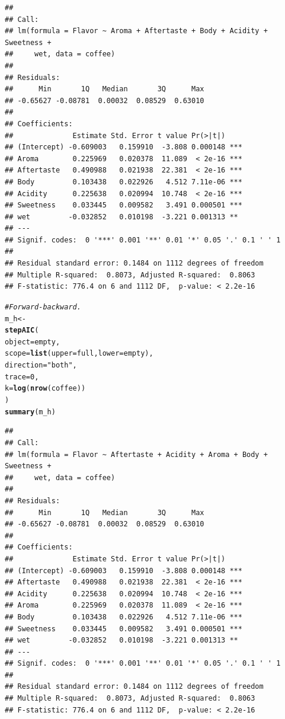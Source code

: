 \documentclass[oneside]{book}\usepackage[]{graphicx}\usepackage[dvipsnames,table,xcdraw]{xcolor}
\makeatletter
\newcommand{\hlnum}[1]{\textcolor[rgb]{0.686,0.059,0.569}{#1}}%
\newcommand{\hlstr}[1]{\textcolor[rgb]{0.192,0.494,0.8}{#1}}%
\newcommand{\hlcom}[1]{\textcolor[rgb]{0.678,0.584,0.686}{\textit{#1}}}%
\newcommand{\hlstd}[1]{\textcolor[rgb]{0.345,0.345,0.345}{#1}}%
\newcommand{\hlkwb}[1]{\textcolor[rgb]{0.69,0.353,0.396}{#1}}%
\newcommand{\hlkwc}[1]{\textcolor[rgb]{0.333,0.667,0.333}{#1}}%
\newcommand{\hlkwd}[1]{\textcolor[rgb]{0.737,0.353,0.396}{\textbf{#1}}}%
\newenvironment{kframe}{%
 \def\at@end@of@kframe{}%
 \ifinner\ifhmode%
  \def\at@end@of@kframe{\end{minipage}}%
  \begin{minipage}{\columnwidth}%
 \fi\fi%
 \def\FrameCommand##1{\hskip\@totalleftmargin \hskip-\fboxsep
 \colorbox{shadecolor}{##1}\hskip-\fboxsep
     \hskip-\linewidth \hskip-\@totalleftmargin \hskip\columnwidth}%
 \MakeFramed {\advance\hsize-\width
   \@totalleftmargin\z@ \linewidth\hsize
   \@setminipage}}%
 {\par\unskip\endMakeFramed%
 \at@end@of@kframe}
\newenvironment{knitrout}{}{} %
\makeatother
\begin{document}
\begin{knitrout}
\begin{kframe}
\begin{verbatim}
## 
## Call:
## lm(formula = Flavor ~ Aroma + Aftertaste + Body + Acidity + Sweetness + 
##     wet, data = coffee)
## 
## Residuals:
##      Min       1Q   Median       3Q      Max 
## -0.65627 -0.08781  0.00032  0.08529  0.63010 
## 
## Coefficients:
##              Estimate Std. Error t value Pr(>|t|)    
## (Intercept) -0.609003   0.159910  -3.808 0.000148 ***
## Aroma        0.225969   0.020378  11.089  < 2e-16 ***
## Aftertaste   0.490988   0.021938  22.381  < 2e-16 ***
## Body         0.103438   0.022926   4.512 7.11e-06 ***
## Acidity      0.225638   0.020994  10.748  < 2e-16 ***
## Sweetness    0.033445   0.009582   3.491 0.000501 ***
## wet         -0.032852   0.010198  -3.221 0.001313 ** 
## ---
## Signif. codes:  0 '***' 0.001 '**' 0.01 '*' 0.05 '.' 0.1 ' ' 1
## 
## Residual standard error: 0.1484 on 1112 degrees of freedom
## Multiple R-squared:  0.8073,	Adjusted R-squared:  0.8063 
## F-statistic: 776.4 on 6 and 1112 DF,  p-value: < 2.2e-16
\end{verbatim}
\begin{alltt}
\hlcom{# Forward-backward.}
\hlstd{m_h} \hlkwb{<-}
\hlkwd{stepAIC}\hlstd{(}
\hlkwc{object} \hlstd{= empty,}
\hlkwc{scope} \hlstd{=} \hlkwd{list}\hlstd{(}\hlkwc{upper} \hlstd{= full,} \hlkwc{lower} \hlstd{= empty),}
\hlkwc{direction} \hlstd{=} \hlstr{"both"}\hlstd{,}
\hlkwc{trace} \hlstd{=} \hlnum{0}\hlstd{,}
\hlkwc{k} \hlstd{=} \hlkwd{log}\hlstd{(}\hlkwd{nrow}\hlstd{(coffee))}
\hlstd{)}
\hlkwd{summary}\hlstd{(m_h)}
\end{alltt}
\begin{verbatim}
## 
## Call:
## lm(formula = Flavor ~ Aftertaste + Acidity + Aroma + Body + Sweetness + 
##     wet, data = coffee)
## 
## Residuals:
##      Min       1Q   Median       3Q      Max 
## -0.65627 -0.08781  0.00032  0.08529  0.63010 
## 
## Coefficients:
##              Estimate Std. Error t value Pr(>|t|)    
## (Intercept) -0.609003   0.159910  -3.808 0.000148 ***
## Aftertaste   0.490988   0.021938  22.381  < 2e-16 ***
## Acidity      0.225638   0.020994  10.748  < 2e-16 ***
## Aroma        0.225969   0.020378  11.089  < 2e-16 ***
## Body         0.103438   0.022926   4.512 7.11e-06 ***
## Sweetness    0.033445   0.009582   3.491 0.000501 ***
## wet         -0.032852   0.010198  -3.221 0.001313 ** 
## ---
## Signif. codes:  0 '***' 0.001 '**' 0.01 '*' 0.05 '.' 0.1 ' ' 1
## 
## Residual standard error: 0.1484 on 1112 degrees of freedom
## Multiple R-squared:  0.8073,	Adjusted R-squared:  0.8063 
## F-statistic: 776.4 on 6 and 1112 DF,  p-value: < 2.2e-16
\end{verbatim}
\end{kframe}
\end{knitrout}
\end{document}
